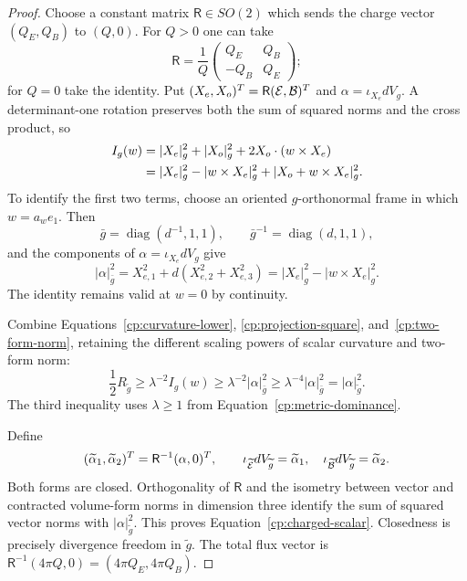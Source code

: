\begin{proof}
Choose a constant matrix $\mathsf R\in SO(2)$ which sends the charge
vector $(Q_E,Q_B)$ to $(Q,0)$.  For $Q>0$ one can take
\[
 \mathsf R=\frac1Q
       \begin{pmatrix}Q_E&Q_B\\-Q_B&Q_E\end{pmatrix};
\]
for $Q=0$ take the identity.  Put
$(X_e,X_o)^T=\mathsf R(\mathcal E,\mathcal B)^T$ and
$\alpha=\iota_{X_e}dV_g$.  A determinant-one rotation preserves
both the sum of squared norms and the cross product, so
\begin{align}
 I_g(w)
 &=|X_e|_g^2+|X_o|_g^2+2X_o\cdot(w\times X_e)\notag\\
 &=|X_e|_g^2-|w\times X_e|_g^2
                  +|X_o+w\times X_e|_g^2.
                  \label{cp:projection-square}
\end{align}
To identify the first two terms, choose an oriented $g$-orthonormal
frame in which $w=a_we_1$.  Then
\[
 \bar g=\operatorname{diag}(d^{-1},1,1),\qquad
 \bar g^{-1}=\operatorname{diag}(d,1,1),
\]
and the components of $\alpha=\iota_{X_e}dV_g$ give
\begin{equation}\label{cp:two-form-norm}
 |\alpha|_{\bar g}^2
 =X_{e,1}^2+d(X_{e,2}^2+X_{e,3}^2)
 =|X_e|_g^2-|w\times X_e|_g^2.
\end{equation}
The identity remains valid at $w=0$ by continuity.

Combine Equations~\eqref{cp:curvature-lower},
\eqref{cp:projection-square}, and~\eqref{cp:two-form-norm}, retaining
the different scaling powers of scalar curvature and two-form norm:
\begin{equation}\label{cp:scaling-chain}
 \frac12R_{\widetilde g}
 \ge\lambda^{-2}I_g(w)
 \ge\lambda^{-2}|\alpha|_{\bar g}^2
 \ge\lambda^{-4}|\alpha|_{\bar g}^2
 =|\alpha|_{\widetilde g}^2.
\end{equation}
The third inequality uses $\lambda\ge1$ from
Equation~\eqref{cp:metric-dominance}.

Define
\[
 (\widetilde\alpha_1,\widetilde\alpha_2)^T
       =\mathsf R^{-1}(\alpha,0)^T,
 \qquad
 \iota_{\widetilde{\mathcal E}}dV_{\widetilde g}
       =\widetilde\alpha_1,
 \quad
 \iota_{\widetilde{\mathcal B}}dV_{\widetilde g}
       =\widetilde\alpha_2.
\]
Both forms are closed.  Orthogonality of $\mathsf R$ and the
isometry between vector and contracted volume-form norms in dimension
three identify the sum of squared vector norms with
$|\alpha|_{\widetilde g}^2$.  This proves
Equation~\eqref{cp:charged-scalar}.  Closedness is precisely
divergence freedom in $\widetilde g$.  The total flux vector is
$\mathsf R^{-1}(4\pi Q,0)=(4\pi Q_E,4\pi Q_B)$.


\end{proof}
